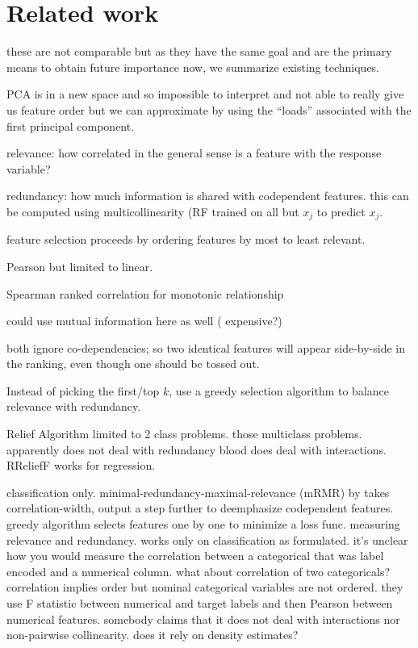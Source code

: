 \documentclass[12pt]{article}
\newcommand{\todo}[1]{{{\color{red}{[#1]}}}}
\begin{document}
\section{Related work}

 these are not comparable but as they have the same goal and are the primary means to obtain future importance now, we summarize existing techniques.

PCA is in a new space and so impossible to interpret and not able to really give us feature order but we can approximate by using the ``loads'' associated with the first principal component.

 relevance: how correlated in the general sense is a feature with the response variable?
 
 redundancy:  how much information is shared with codependent features. this can be computed using multicollinearity (RF trained on all but $x_j$ to predict $x_j$.
 
 feature selection proceeds by ordering features by most to least relevant. 
 
Pearson but limited to linear.

Spearman ranked correlation  for monotonic relationship

 could use mutual information here as well ( expensive?)
 
 both ignore co-dependencies; so two identical features will appear side-by-side in the ranking, even though one should be tossed out.

Instead of picking the first/top $k$, use a greedy selection algorithm to balance relevance with redundancy.

\todo{We deal with all possible combinations for codependency's because of the nature of the partial dependence mechanism.}

Relief Algorithm \cite{relief} limited to 2 class problems. \cite{ReliefF}  those multiclass problems. apparently does not deal with redundancy blood does deal with interactions. RReliefF works for regression. \cite{RReliefF}

 classification only. minimal-redundancy-maximal-relevance (mRMR) by \cite{mRMR}  takes correlation-width, output a step further to deemphasize codependent features. greedy algorithm selects features one by one to minimize a loss func.  measuring relevance and redundancy.  works only on classification as formulated. it's unclear how you would measure the correlation between a categorical that was label encoded and a numerical column. what about correlation of two categoricals? correlation implies order but nominal categorical variables are not ordered. they use F statistic between numerical and target labels and then Pearson between numerical features. somebody claims that it does not deal with interactions nor non-pairwise collinearity. does it rely on density estimates?
\end{document}
